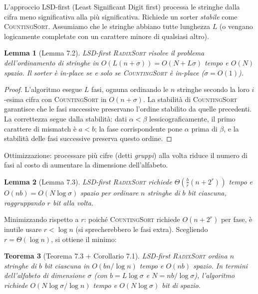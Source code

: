 \documentclass[12pt, a4paper, oneside]{book}
\theoremstyle{plain}
\newtheorem{teorema}{Teorema}[chapter]
\newtheorem{lemma}[teorema]{Lemma}
\theoremstyle{definition}
\theoremstyle{remark}
\begin{document}
L'approccio LSD-first (Least Significant Digit first) processa le stringhe dalla cifra meno significativa alla più significativa. Richiede un sorter \emph{stabile} come \textsc{CountingSort}. Assumiamo che le stringhe abbiano tutte lunghezza $L$ (o vengano logicamente completate con un carattere minore di qualsiasi altro).

\begin{lemma}[Lemma 7.2]
LSD-first \textsc{RadixSort} risolve il problema dell'ordinamento di stringhe in $O(L(n + \sigma)) = O(N + L\sigma)$ tempo e $O(N)$ spazio. Il sorter è in-place se e solo se \textsc{CountingSort} è in-place ($\sigma = O(1)$).
\end{lemma}

\begin{proof}
L'algoritmo esegue $L$ fasi, ognuna ordinando le $n$ stringhe secondo la loro $i$-esima cifra con \textsc{CountingSort} in $O(n + \sigma)$. La stabilità di \textsc{CountingSort} garantisce che le fasi successive preservano l'ordine stabilito da quelle precedenti. La correttezza segue dalla stabilità: dati $\alpha < \beta$ lessicograficamente, il primo carattere di mismatch è $a < b$; la fase corrispondente pone $\alpha$ prima di $\beta$, e la stabilità delle fasi successive preserva questo ordine.
\end{proof}

Ottimizzazione: processare più cifre (detti \emph{gruppi}) alla volta riduce il numero di fasi al costo di aumentare la dimensione dell'alfabeto.

\begin{lemma}[Lemma 7.3]
LSD-first \textsc{RadixSort} richiede $\Theta\!\left(\frac{b}{r}(n + 2^r)\right)$ tempo e $O(nb) = O(N\log\sigma)$ spazio per ordinare $n$ stringhe di $b$ bit ciascuna, raggruppando $r$ bit alla volta.
\end{lemma}

Minimizzando rispetto a $r$: poiché \textsc{CountingSort} richiede $O(n + 2^r)$ per fase, è inutile usare $r < \log n$ (si sprecherebbero le fasi extra). Scegliendo $r = \Theta(\log n)$, si ottiene il minimo:

\begin{teorema}[Teorema 7.3 + Corollario 7.1]
LSD-first \textsc{RadixSort} ordina $n$ stringhe di $b$ bit ciascuna in $O(bn/\log n)$ tempo e $O(nb)$ spazio. In termini dell'alfabeto di dimensione $\sigma$ (con $b = L\log\sigma$ e $N = nb/\log\sigma$), l'algoritmo richiede $O(N\log\sigma/\log n)$ tempo e $O(N\log\sigma)$ bit di spazio.
\end{teorema}
\end{document}
